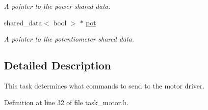 \begin{DoxyCompactItemize}
\begin{DoxyCompactList}\small\item\em \-A pointer to the power shared data. \end{DoxyCompactList}\item 
\hypertarget{classtask__motor_afe8cab4e912b4814d29a8b9f0d091f48}{shared\-\_\-data$<$ bool $>$ $\ast$ \hyperlink{classtask__motor_afe8cab4e912b4814d29a8b9f0d091f48}{pot}}\label{classtask__motor_afe8cab4e912b4814d29a8b9f0d091f48}

\begin{DoxyCompactList}\small\item\em \-A pointer to the potentiometer shared data. \end{DoxyCompactList}\end{DoxyCompactItemize}


\subsection{\-Detailed \-Description}
\-This task determines what commands to send to the motor driver. 

\-Definition at line 32 of file task\-\_\-motor.\-h.



